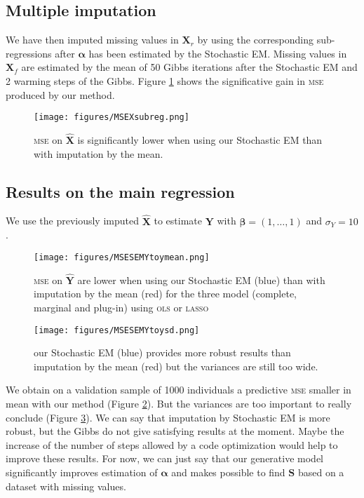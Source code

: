 \documentclass[12pt,a4paper]{report}
\begin{document}
		
			\subsection{Multiple imputation}
			We have then imputed missing values in $\boldsymbol{X}_r$  by using the corresponding sub-regressions after $\boldsymbol{\alpha}$ has been estimated  by the Stochastic EM.
			Missing values in $\boldsymbol{X}_f$ are estimated by the mean of 50 Gibbs iterations after the Stochastic EM and 2 warming steps of the Gibbs. Figure \ref{MSEXsubreg} shows the significative gain in \textsc{mse} produced by our method.
			\begin{figure}[h!]
	\centering
	\texttt{[image: figures/MSEXsubreg.png]} 
	\caption{\textsc{mse} on $\hat{\boldsymbol{X}}$ is significantly lower when using our Stochastic EM than with imputation by the mean.}\label{MSEXsubreg}
\end{figure}  
\FloatBarrier
		\subsection{Results on the main regression}
		We use the previously imputed $\hat{\boldsymbol{X}}$ to estimate $\boldsymbol{Y}$ with $\boldsymbol{\beta}=(1,\dots,1)$ and $\sigma_Y=10$.
			\begin{figure}[h!]
	\centering
	\texttt{[image: figures/MSESEMYtoymean.png]} 
	\caption{\textsc{mse} on $\hat{\boldsymbol{Y}}$ are lower when using our Stochastic EM (blue) than with imputation by the mean (red) for the three model (complete, marginal and plug-in) using \textsc{ols} or \textsc{lasso}}\label{MSESEMYtoymean}
\end{figure}	

			\begin{figure}[h!]
	\centering
	\texttt{[image: figures/MSESEMYtoysd.png]} 
	\caption{our Stochastic EM (blue) provides more robust results than imputation by the mean (red) but the variances are still too wide.}\label{MSESEMYtoysd}
\end{figure}		
We obtain on a validation sample of 1000 individuals a predictive \textsc{mse} smaller in mean with our method (Figure \ref{MSESEMYtoymean}). But the variances are too important to really conclude (Figure \ref{MSESEMYtoysd}). We can say that imputation by Stochastic EM is more robust, but the Gibbs do not give satisfying results at the moment. Maybe the increase of the number of steps allowed by a code optimization would help to improve these results. For now, we can just say that our generative model significantly improves estimation of $\boldsymbol{\alpha}$ and makes possible to find $\boldsymbol{S}$ based on a dataset with missing values.\\
\end{document}

